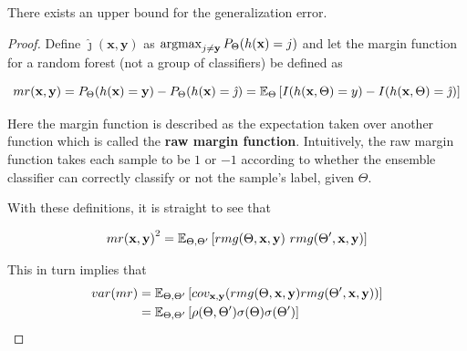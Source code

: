 
\begin{theorem}
There exists an upper bound for the generalization error.
\end{theorem}


\begin{proof}
	Define $\hat{\jmath}( \textbf{x},\textbf{y})$ as $\operatorname*{argmax}_{j \neq \textbf{y}} P_{\Theta}(h(\textbf{x}) = j)$ and let the margin function for a random forest (not a group of classifiers) be defined as

	\[\label{eq:rf-marginFunRf}
	mr(\textbf{x},\textbf{y}) = P_{\Theta}(h(\textbf{x}) = \textbf{y}) - P_{\Theta}(h(\textbf{x}) = \hat{\jmath})
	\\
	= \operatorname{\mathbb{E}}_{\Theta} \left[ I(h(\textbf{x},\Theta ) = y ) - I( h( \textbf{x},\Theta ) = \hat{\jmath} ) \right]
	\]




	Here the margin function is described as the expectation taken over another function which is called the \textbf{raw margin function}\label{eq:rf-rawMarginFun}. Intuitively, the raw margin function takes each sample to be $1$ or $-1$ according to whether the ensemble classifier can correctly classify or not the sample's label, given $\Theta$.

	With these definitions, it is straight to see that

            \begin{equation}
            {mr( \textbf{x},\textbf{y} )}^2 = \Expect_{\Theta, \Theta'} \left[ rmg( \Theta,\textbf{x},\textbf{y} ) \ rmg(\Theta',\textbf{x},\textbf{y} ) \right]
            \end{equation}


	This in turn implies that
            \begin{equation}\label{eq:rf-marginFunVar}
	            \begin{split}
	            var(mr) & = \operatorname{\mathbb{E}}_{\Theta, \Theta'}
	            \left[
	            cov_{\textbf{x},\textbf{y}}
	            (rmg(\Theta,\textbf{x},\textbf{y} )rmg(\Theta',\textbf{x},\textbf{y} ))
	            \right] \\
	            & = \operatorname{\mathbb{E}}_{\Theta, \Theta'}
	            \left[
	            \rho(\Theta, \Theta')\sigma(\Theta)\sigma(\Theta')
	            \right]
	            \end{split}
            \end{equation}


\end{proof}
